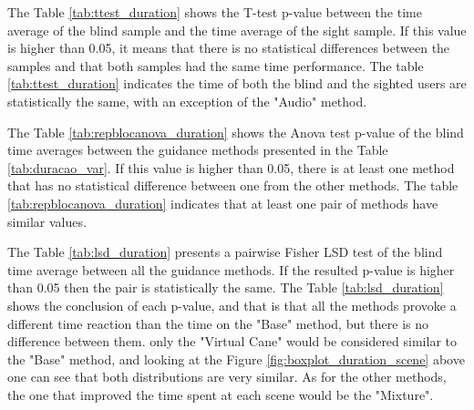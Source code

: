 %

The Table \ref{tab:ttest_duration} shows the T-test p-value between the time average of the blind sample and the time average of the sight sample. If this value is higher than 0.05, it means that there is no statistical differences between the samples and that both samples had the same time performance. The table \ref{tab:ttest_duration} indicates the time of both the blind and the sighted users are statistically the same, with an exception of the "Audio" method.

%

\begin{table}[!htb]
    \begin{minipage}{.45\linewidth}
        
    \end{minipage}
    \hfill
    \begin{minipage}{.45\linewidth}
        \vspace{-1.5cm}
        
    \end{minipage}
\end{table}

The Table \ref{tab:repblocanova_duration} shows the Anova test p-value of the blind time averages between the guidance methods presented in the Table \ref{tab:duracao_var}. If this value is higher than 0.05, there is at least one method that has no statistical difference between one from the other methods. The table \ref{tab:repblocanova_duration} indicates that at least one pair of methods have similar values.

%

%

%



The Table \ref{tab:lsd_duration} presents a pairwise Fisher LSD test of the blind time average between all the guidance methods. If the resulted p-value is higher than 0.05 then the pair is statistically the same. The Table \ref{tab:lsd_duration} shows the conclusion of each p-value, and that is that all the methods provoke a different time reaction than the time on the "Base" method, but there is no difference between them. only the "Virtual Cane" would be considered similar to the "Base" method, and looking at the Figure \ref{fig:boxplot_duration_scene} above one can see that both distributions are very similar. As for the other methods, the one that improved the time spent at each scene would be the "Mixture". 

